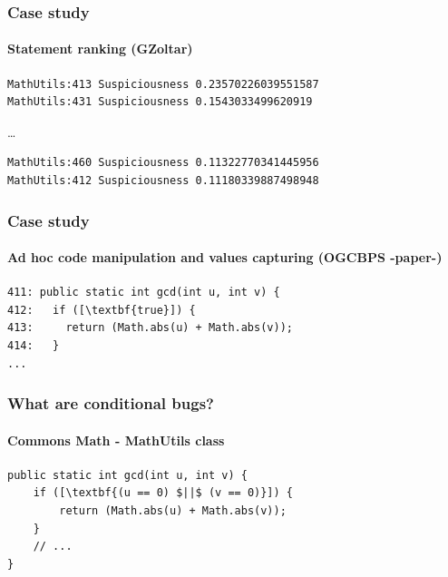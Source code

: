 \documentclass[onlymath]{beamer}
\begin{document}
 \begin{frame}[fragile]
    \frametitle{Case study}
      \framesubtitle{Statement ranking (GZoltar)}
\begin{verbatim}
MathUtils:413 Suspiciousness 0.23570226039551587
MathUtils:431 Suspiciousness 0.1543033499620919
\end{verbatim}
\dots
\begin{verbatim}
MathUtils:460 Suspiciousness 0.11322770341445956
MathUtils:412 Suspiciousness 0.11180339887498948
\end{verbatim}
\end{frame}

 \begin{frame}[fragile]
    \frametitle{Case study}
      \framesubtitle{Ad hoc code manipulation and values capturing (OGCBPS -paper-)}
\begin{lstlisting}[escapeinside=\[\]]
411: public static int gcd(int u, int v) {
412:   if ([\textbf{true}]) {
413:     return (Math.abs(u) + Math.abs(v));
414:   }
...
\end{lstlisting}
\end{frame}

 \begin{frame}[fragile]
    \frametitle{What are conditional bugs?}
    \framesubtitle{Commons Math - MathUtils class}
        \begin{lstlisting}[escapeinside=\[\]]
public static int gcd(int u, int v) {
    if ([\textbf{(u == 0) $||$ (v == 0)}]) {
        return (Math.abs(u) + Math.abs(v));
    }
    // ...
}
	\end{lstlisting}
\end{frame}
\end{document}

